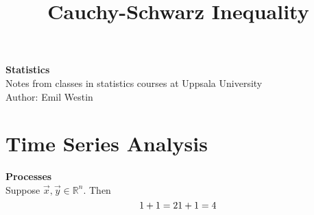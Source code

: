 \documentclass[11pt]{article}
\begin{document}
\title{Cauchy-Schwarz Inequality}

\thispagestyle{empty}

\begin{center}
{\LARGE \bf Statistics}\\
Notes from classes in statistics courses at Uppsala University \\
Author: Emil Westin
\end{center}

\section{Time Series Analysis}

\textbf{Processes}\\

Suppose $\vec{x},\vec{y} \in \mathbb{R}^n$. Then 
\begin{equation}
1+1 = 2 \label{MA1} \\
1+1 = 4 \label{MA2} \\
\end{equation}
\end{document}

